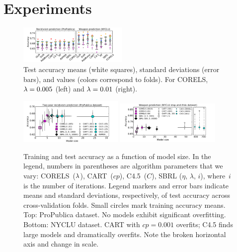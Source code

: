 \section{Experiments}
\label{sec:experiments}

\begin{figure}[t!]
\begin{center}
\includegraphics[trim={8mm, 10mm, 15mm, 5mm},
width=0.47\textwidth]{figs/compare-compas-weapon.pdf}
\end{center}
\caption{Test accuracy means (white squares),
standard deviations (error bars),
and values (colors correspond to folds).
For CORELS, ${{\lambda} = 0.005}$ (left) and ${{\lambda} = 0.01}$ (right).
}
\label{fig:comparison}
\end{figure}

\begin{figure}[t!]
\begin{center}
\includegraphics[trim={12mm, 5mm, 24mm, 10mm}, width=0.45\textwidth]{figs/compas-sparsity-training.pdf}
\includegraphics[trim={15mm, 0mm, 24mm, 1mm}, width=0.45\textwidth]{figs/frisk-sparsity-training-c45.pdf}
\end{center}
\vspace{-5mm}
\caption{Training and test accuracy as a function of model size.
%
In the legend, numbers in parentheses are algorithm parameters that we vary:
CORELS~(${\lambda}$), CART~($cp$), C4.5~($C$), SBRL ($\eta$, $\lambda$, $i$),
where~$i$ is the number of iterations.
%
Legend markers and error bars indicate means and standard deviations,
respectively, of test accuracy across cross-validation folds.
%
Small circles mark training accuracy means.
%
Top: ProPublica dataset.
%
No models exhibit significant overfitting.
%
Bottom: NYCLU dataset.
%
CART with ${cp = 0.001}$ overfits;
C4.5 finds large models and dramatically overfits. %
%
Note the broken horizontal axis and change in scale.
}
\label{fig:sparsity}
\end{figure}

